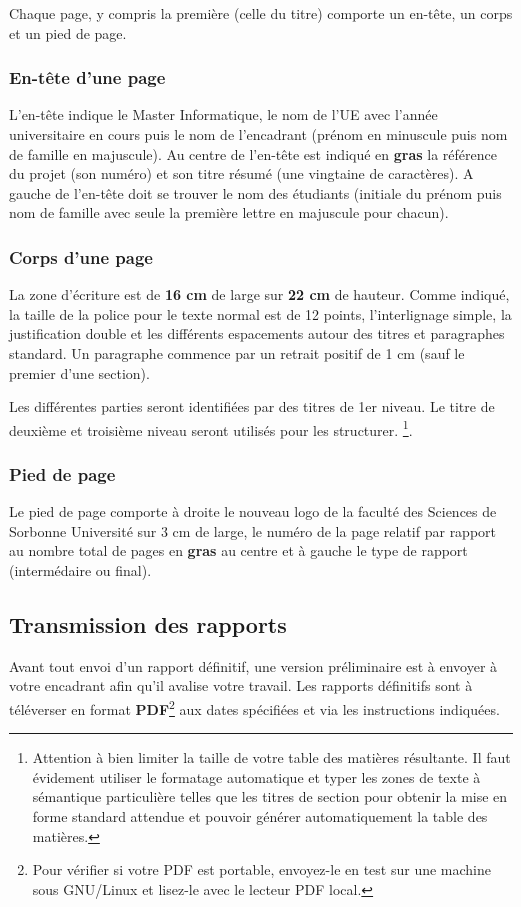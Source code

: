\documentclass[a4paper,12pt]{article}
\begin{document}
Chaque page, y compris la première (celle du titre) comporte un en-tête, un
corps et un pied de page.

\subsubsection{En-tête d'une page}
L'en-tête indique le Master Informatique, 
le nom de l'UE avec l'année universitaire en cours puis
le nom de l'encadrant (prénom en minuscule puis nom de famille en majuscule).
Au centre de l'en-tête est indiqué en \textbf{gras} la référence du projet (son numéro) et son titre résumé (une vingtaine de caractères). 
A gauche de l'en-tête doit se trouver le nom des étudiants (initiale du prénom puis nom de famille avec seule la première lettre en majuscule pour chacun).

\subsubsection{Corps d'une page}
La zone d'écriture est de \textbf{16 cm} de large sur \textbf{22 cm} de
hauteur. Comme indiqué, la taille de la police pour le texte
normal est de 12 points, l'interlignage simple, la justification double et
les différents espacements autour des titres et paragraphes standard. Un
paragraphe commence par un retrait positif de 1 cm (sauf le premier d'une section). 

Les différentes parties seront identifiées par des titres de 1er niveau. Le
titre de deuxième et troisième niveau seront utilisés pour les structurer.
\footnote{ Attention à bien limiter la taille de votre table des
matières résultante. Il faut évidement utiliser le formatage automatique et
typer les zones de texte à sémantique particulière telles que les titres de
section pour obtenir la mise en forme standard attendue et pouvoir générer
automatiquement la table des matières.}.

\subsubsection{Pied de page}
Le pied de page comporte à droite le nouveau logo de la faculté des Sciences de Sorbonne Université sur 3 cm de large, le numéro de la page relatif par rapport au nombre total de pages en \textbf{gras} au centre et à gauche le type de rapport (intermédaire ou final).

\subsection{Transmission des rapports}
Avant tout envoi d'un rapport définitif, une version préliminaire est à envoyer à votre encadrant afin qu'il avalise votre travail. Les rapports définitifs sont à téléverser en format \textbf{PDF}\footnote{Pour vérifier si votre PDF est portable, envoyez-le en test sur une machine sous GNU/Linux et lisez-le avec le lecteur PDF local.} aux dates spécifiées et via les instructions indiquées. 
\end{document}
